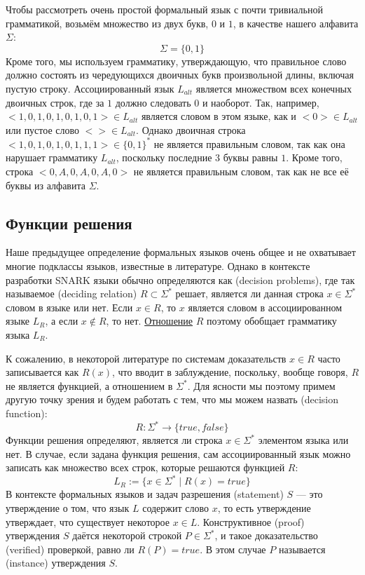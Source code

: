 \begin{example}
\label{ex:alternating_strings_lang}
Чтобы рассмотреть очень простой формальный язык с почти тривиальной грамматикой, возьмём множество из двух букв, $0$ и $1$, в качестве нашего алфавита $\Sigma$:
$$
\Sigma = \{0,1\}
$$
Кроме того, мы используем грамматику, утверждающую, что правильное слово должно состоять из чередующихся двоичных букв произвольной длины, включая пустую строку. Ассоциированный язык $L_{alt}$ является множеством всех конечных двоичных строк, где за $1$ должно следовать $0$ и наоборот. Так, например, $<1,0,1,0,1,0,1,0,1>\in L_{alt}$ является словом в этом языке, как и $<0>\in L_{alt}$ или пустое слово $<>\in L_{alt}$. Однако двоичная строка $<1,0,1,0,1,0,1,1,1>\in \{0,1\}^*$ не является правильным словом, так как она нарушает грамматику $L_{alt}$, поскольку последние 3 буквы равны $1$. Кроме того, строка $<0,A,0,A,0,A,0>$ не является правильным словом, так как не все её буквы из алфавита $\Sigma$.
\end{example}

\subsection{Функции решения}
\label{sec:decision_function}
 Наше предыдущее определение формальных языков очень общее и не охватывает многие подклассы языков, известные в литературе. Однако в контексте разработки SNARK языки обычно определяются как  (decision problems), где так называемое  (deciding relation) $R\subset \Sigma^*$ решает, является ли данная строка $x\in \Sigma^*$ словом в языке или нет. Если $x\in R$, то $x$ является словом в ассоциированном языке $L_R$, а если $x\notin R$, то нет. \href{https://en.wikipedia.org/wiki/Relation_(mathematics)}{Отношение} $R$ поэтому обобщает грамматику языка $L_R$.

К сожалению, в некоторой литературе по системам доказательств $x\in R$ часто записывается как $R(x)$, что вводит в заблуждение, поскольку, вообще говоря, $R$ не является функцией, а отношением в $\Sigma^*$. Для ясности мы поэтому примем другую точку зрения и будем работать с тем, что мы можем назвать  (decision function):
\begin{equation}\label{eq:decision-function}
R: \Sigma^* \to \{true, false\}
\end{equation}
Функции решения определяют, является ли строка $x\in \Sigma^*$ элементом языка или нет. В случае, если задана функция решения, сам ассоциированный язык можно записать как множество всех строк, которые решаются функцией $R$:
\begin{equation}
L_R := \{x\in \Sigma^*\;|\; R(x)=true\}
\end{equation}
В контексте формальных языков и задач разрешения  (statement) $S$ — это утверждение о том, что язык $L$ содержит слово $x$, то есть утверждение утверждает, что существует некоторое $x\in L$. Конструктивное  (proof) утверждения $S$ даётся некоторой строкой $P\in \Sigma^*$, и такое доказательство  (verified) проверкой, равно ли $R(P)=true$. В этом случае $P$ называется  (instance) утверждения $S$.

